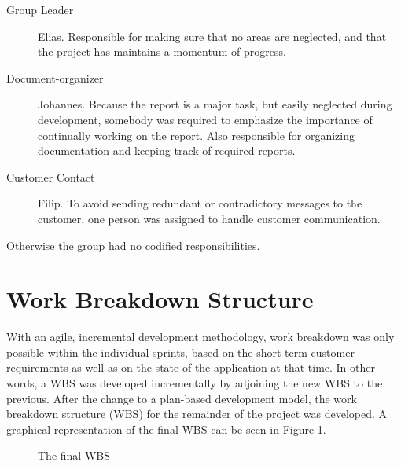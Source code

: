 \begin{description}
\item[Group Leader] Elias. Responsible for making sure that no areas are neglected, and that the project has maintains a momentum of progress.
\item[Document-organizer] Johannes. Because the report is a major task, but easily neglected during development, somebody was required to emphasize the importance of continually working on the report. Also responsible for organizing documentation and keeping track of required reports.
\item[Customer Contact] Filip. To avoid sending redundant or contradictory messages to the customer, one person was assigned to handle customer communication.
\end{description}
 
Otherwise the group had no codified responsibilities.
 
\section{Work Breakdown Structure}
With an agile, incremental development methodology, work breakdown was only possible within the individual sprints, based on the short-term customer requirements as well as on the state of the application at that time. In other words, a WBS was developed incrementally by adjoining the new WBS to the previous. After the change to a plan-based development model, the work breakdown structure (WBS) for the remainder of the project was developed. A graphical representation of the final WBS can be seen in Figure \ref{fig:WBS}.

\begin{figure}[p]

\setlength\fboxsep{0pt}
\setlength\fboxrule{1pt}\noindent{}

\caption{The final WBS}
\label{fig:WBS}
\end{figure}
